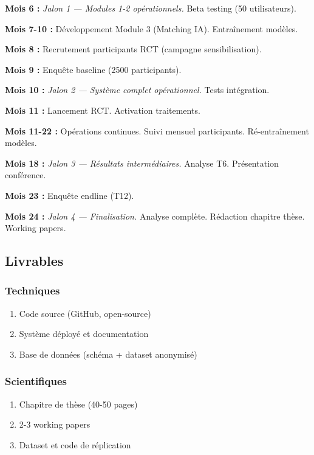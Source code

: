 \documentclass[12pt]{article}
\begin{document}
\textbf{Mois 6 :} \textit{Jalon 1 — Modules 1-2 opérationnels.} Beta testing (50 utilisateurs).

\textbf{Mois 7-10 :} Développement Module 3 (Matching IA). Entraînement modèles.

\textbf{Mois 8 :} Recrutement participants RCT (campagne sensibilisation).

\textbf{Mois 9 :} Enquête baseline (2500 participants).

\textbf{Mois 10 :} \textit{Jalon 2 — Système complet opérationnel.} Tests intégration.

\textbf{Mois 11 :} Lancement RCT. Activation traitements.

\textbf{Mois 11-22 :} Opérations continues. Suivi mensuel participants. Ré-entraînement modèles.

\textbf{Mois 18 :} \textit{Jalon 3 — Résultats intermédiaires.} Analyse T6. Présentation conférence.

\textbf{Mois 23 :} Enquête endline (T12).

\textbf{Mois 24 :} \textit{Jalon 4 — Finalisation.} Analyse complète. Rédaction chapitre thèse. Working papers.

\subsection{Livrables}

\subsubsection{Techniques}

\begin{enumerate}
    \item Code source (GitHub, open-source)
    \item Système déployé et documentation
    \item Base de données (schéma + dataset anonymisé)
\end{enumerate}

\subsubsection{Scientifiques}

\begin{enumerate}
    \item Chapitre de thèse (40-50 pages)
    \item 2-3 working papers
    \item Dataset et code de réplication
\end{enumerate}
\end{document}

